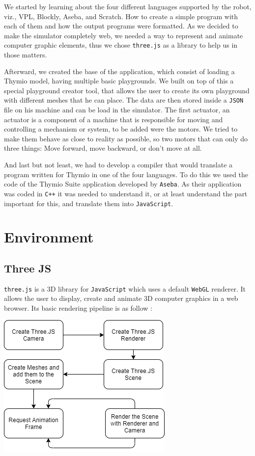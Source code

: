 \documentclass{scrbook}
\begin{document}
We started by learning about the four different languages supported by the robot, viz., VPL, Blockly, Aseba, and Scratch. How to create a simple program with each of them and how the output programs were formatted. 
As we decided to make the simulator completely web, we needed a way to represent and animate computer graphic elements, thus we chose \texttt{three.js} as a library to help us in those matters.

Afterward, we created the base of the application, which consist of loading a Thymio model, having multiple basic playgrounds. We built on top of this a special playground creator tool, that allows the user to create its own playground with different meshes that he can place. 
The data are then stored inside a \texttt{JSON} file on his machine and can be load in the simulator. The first actuator, an actuator is a component of a machine that is responsible for moving and controlling a mechanism or system, 
to be added were the motors. We tried to make them behave as close to reality as possible, so two motors that can only do three things: Move forward, move backward, or don’t move at all.

And last but not least, we had to develop a compiler that would translate a program written for Thymio in one of the four languages. To do this we used the code of the Thymio Suite application developed by \texttt{Aseba}. 
As their application was coded in \texttt{C++} it was needed to understand it, or at least understand the part important for this, and translate them into \texttt{JavaScript}. 
\clearpage

\tableofcontents
\clearpage

\chapter{Environment}

\section{Three JS}

\texttt{three.js} is a 3D library for \texttt{JavaScript} which uses a default \texttt{WebGL} renderer. It allows the user to display, create and animate 3D computer graphics in a web browser. Its basic rendering pipeline is as follow :
\begin{center}
  \includegraphics[scale=0.5]{./basic_threejs_rendering}
\end{center}
\end{document}
